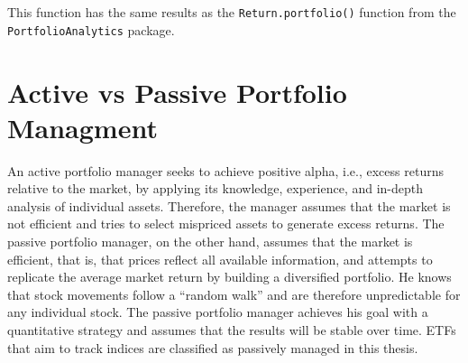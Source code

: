 \documentclass[
  oneside, a4paper, 12pt, openany]{book}
\newenvironment{Shaded}{\begin{snugshade}}{\end{snugshade}}
\newcommand{\AttributeTok}[1]{\textcolor[rgb]{0.77,0.63,0.00}{#1}}
\newcommand{\ControlFlowTok}[1]{\textcolor[rgb]{0.13,0.29,0.53}{\textbf{#1}}}
\newcommand{\DecValTok}[1]{\textcolor[rgb]{0.00,0.00,0.81}{#1}}
\newcommand{\FunctionTok}[1]{\textcolor[rgb]{0.00,0.00,0.00}{#1}}
\newcommand{\NormalTok}[1]{#1}
\newcommand{\OtherTok}[1]{\textcolor[rgb]{0.56,0.35,0.01}{#1}}
\newcommand{\SpecialCharTok}[1]{\textcolor[rgb]{0.00,0.00,0.00}{#1}}
\newcommand{\StringTok}[1]{\textcolor[rgb]{0.31,0.60,0.02}{#1}}
\theoremstyle{definition}
\theoremstyle{definition}
\theoremstyle{definition}
\theoremstyle{definition}
\theoremstyle{remark}
\begin{document}
\begin{Shaded}
\end{Shaded}

\normalsize\vspace{0.1cm}

This function has the same results as the \texttt{Return.portfolio()} function from the \texttt{PortfolioAnalytics} package.

\hypertarget{activevspassive}{%
\chapter{Active vs Passive Portfolio Managment}\label{activevspassive}}

An active portfolio manager seeks to achieve positive alpha, i.e., excess returns relative to the market, by applying its knowledge, experience, and in-depth analysis of individual assets. Therefore, the manager assumes that the market is not efficient and tries to select mispriced assets to generate excess returns. The passive portfolio manager, on the other hand, assumes that the market is efficient, that is, that prices reflect all available information, and attempts to replicate the average market return by building a diversified portfolio. He knows that stock movements follow a ``random walk'' and are therefore unpredictable for any individual stock. The passive portfolio manager achieves his goal with a quantitative strategy and assumes that the results will be stable over time. ETFs that aim to track indices are classified as passively managed in this thesis.
\end{document}
